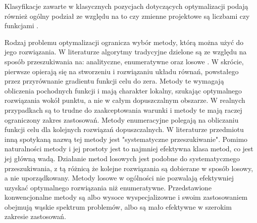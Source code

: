 Klasyfikacje zawarte w klasycznych pozycjach dotyczących optymalizacji podają również ogólny podział ze względu na to czy zmienne projektowe są liczbami czy funkcjami \parencite{Szymczak1995,Findeisen1980}.

Rodzaj problemu optymalizacji ogranicza wybór metody, którą można użyć do jego rozwiązania. W literaturze algorytmy tradycyjne dzielone są ze względu na sposób przeszukiwania na: analityczne, enumeratywne oraz losowe \parencite{Goldberg1995}. W skrócie, pierwsze opierają się na stworzeniu i rozwiązaniu układu równań, powstałego przez przyrównanie gradientu funkcji celu do zera. Metody te wymagają obliczenia pochodnych funkcji i mają charakter lokalny, szukając optymalnego rozwiązania wokół punktu, a nie w całym dopuszczalnym obszarze. W realnych przypadkach są to trudne do zaakceptowania warunki i metody te mają raczej ograniczony zakres zastosowań. Metody enumeracyjne polegają na obliczaniu funkcji celu dla kolejnych rozwiązań dopuszczalnych. W literaturze przedmiotu inną spotykaną nazwą tej metody jest "systematyczne przeszukiwanie". Pomimo naturalności metody i jej prostoty jest to najmniej efektywna klasa metod, co jest jej główną wadą. Działanie metod losowych jest podobne do systematycznego przeszukiwania, z tą różnicą że kolejne rozwiązania są dobierane w sposób losowy, a nie uporządkowany. Metody losowe w ogólności nie pozwalają efektywniej uzyskać optymalnego rozwiązania niż enumeratywne. Przedstawione konwencjonalne metody są albo wysoce wyspecjalizowne i swoim zastosowaniem obejmują wąskie spektrum problemów, albo są mało efektywne w szerokim zakresie zastosowań. 

